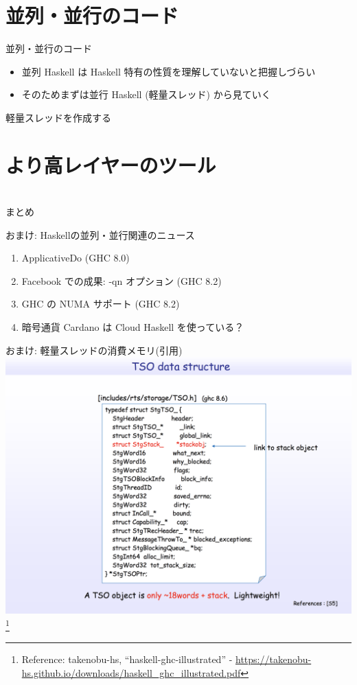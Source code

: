 \documentclass[unicode,12pt]{beamer}
\begin{document}
\section{並列・並行のコード}

\begin{frame}{並列・並行のコード}
  \begin{itemize}
  \item 並列 Haskell は Haskell 特有の性質を理解していないと把握しづらい
  \item そのためまずは並行 Haskell (軽量スレッド) から見ていく
  \end{itemize}
\end{frame}

\begin{frame}{軽量スレッドを作成する}

\end{frame}

\section{より高レイヤーのツール}

\begin{frame}{}
\end{frame}

\section{}

\begin{frame}{まとめ}

\end{frame}

\begin{frame}[plain]{おまけ: Haskellの並列・並行関連のニュース}
  \begin{enumerate}
  \item ApplicativeDo (GHC 8.0)
  \item Facebook での成果: -qn オプション (GHC 8.2)
  \item GHC の NUMA サポート (GHC 8.2)
  \item 暗号通貨 Cardano は Cloud Haskell を使っている？
  \end{enumerate}
\end{frame}

\begin{frame}[plain]{おまけ: 軽量スレッドの消費メモリ(引用)}
  \centering
  \includegraphics[width=.7\textwidth]{pic/tso.png}
  \footnote{Reference: takenobu-hs, ``haskell-ghc-illustrated'' - \url{https://takenobu-hs.github.io/downloads/haskell_ghc_illustrated.pdf}}
\end{frame}
\end{document}
